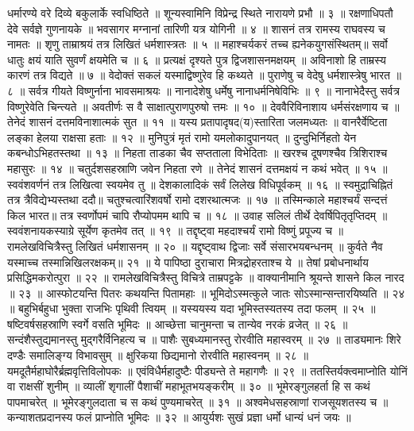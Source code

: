 धर्मारण्ये वरे दिव्ये बकुलार्के स्वधिष्ठिते ॥
शून्यस्वामिनि विप्रेन्द्र स्थिते नारायणे प्रभौ ॥ ३ ॥
रक्षणाधिपतौ देवे सर्वज्ञे गुणनायके ॥
भवसागर मग्नानां तारिणी यत्र योगिनी ॥ ४ ॥
शासनं तत्र रामस्य राघवस्य च नामतः ॥
शृणु ताम्राश्रयं तत्र लिखितं धर्मशास्त्रतः ॥ ५ ॥
महाश्चर्यकरं तच्च ह्यनेकयुगसंस्थितम्॥
सर्वो धातुः क्षयं याति सुवर्णं क्षयमेति च ॥ ६ ॥
प्रत्यक्षं दृश्यते पुत्र द्विजशासनमक्षयम् ॥
अविनाशो हि ताम्रस्य कारणं तत्र विद्यते ॥ ७ ॥
वेदोक्तं सकलं यस्माद्विष्णुरेव हि कथ्यते ॥
पुराणेषु च वेदेषु धर्मशास्त्रेषु भारत ॥ ८ ॥
सर्वत्र गीयते विष्णुर्नाना भावसमाश्रयः ॥
नानादेशेषु धर्मेषु नानाधर्मनिषेविभिः ॥ ९ ॥
नानाभेदैस्तु सर्वत्र विष्णुरेवेति चिन्त्यते ॥
अवतीर्णः स वै साक्षात्पुराणपुरुषो त्तमः ॥ १० ॥
देववैरिविनाशाय धर्मसंरक्षणाय च ॥
तेनेदं शासनं दत्तमविनाशात्मकं सुत ॥ ११ ॥
यस्य प्रतापादृषद(य)स्तारिता जलमध्यतः ॥
वानरैर्वेष्टिता लङ्का हेलया राक्षसा हताः ॥ १२ ॥
मुनिपुत्रं मृतं रामो यमलोकादुपानयत् ॥
दुन्दुभिर्निहतो येन कबन्धोऽभिहतस्तथा ॥ १३ ॥
निहता ताडका चैव सप्तताला विभेदिताः ॥
खरश्च दूषणश्चैव त्रिशिराश्च महासुरः ॥ १४ ॥
चतुर्दशसहस्राणि जवेन निहता रणे ॥
तेनेदं शासनं दत्तमक्षयं न कथं भवेत् ॥ १५ ॥
स्ववंशवर्णनं तत्र लिखित्वा स्वयमेव तु ॥
देशकालादिकं सर्वं लिलेख विधिपूर्वकम् ॥ १६ ॥
स्वमुद्राचिह्नितं तत्र त्रैविद्येभ्यस्तथा ददौ॥
चतुश्चत्वारिंशवर्षो रामो दशरथात्मजः ॥ १७ ॥
तस्मिन्काले महाश्चर्यं सन्दत्तं किल भारत॥
तत्र स्वर्णोपमं चापि रौप्योपमम थापि च ॥ १८ ॥
उवाह सलिलं तीर्थे देवर्षिपितृतृप्तिदम् ॥
स्ववंशनायकस्याग्रे सूर्येण कृतमेव तत् ॥ १९ ॥
तद्दृष्ट्वा महदाश्चर्यं रामो विष्णुं प्रपूज्य च ॥
रामलेखविचित्रैस्तु लिखितं धर्मशासनम् ॥ २० ॥
यद्दृष्ट्वाथ द्विजाः सर्वे संसारभयबन्धनम् ॥
कुर्वते नैव यस्माच्च तस्मान्निखिलरक्षकम्॥ २१ ॥
ये पापिष्ठा दुराचारा मित्रद्रोहरताश्च ये ॥
तेषां प्रबोधनार्थाय प्रसिद्धिमकरोत्पुरा ॥ २२ ॥
रामलेखविचित्रैस्तु विचित्रे ताम्रपट्टके ॥
वाक्यानीमानि श्रूयन्ते शासने किल नारद ॥ २३ ॥
आस्फोटयन्ति पितरः कथयन्ति पितामहाः ॥
भूमिदोऽस्मत्कुले जातः सोऽस्मान्सन्तारयिष्यति ॥ २४ ॥
बहुभिर्बहुधा भुक्ता राजभिः पृथिवी त्वियम् ॥
यस्ययस्य यदा भूमिस्तस्यतस्य तदा फलम् ॥ २५ ॥
षष्टिवर्षसहस्राणि स्वर्गे वसति भूमिदः ॥
आच्छेत्ता चानुमन्ता च तान्येव नरकं व्रजेत् ॥ २६ ॥
सन्दंशैस्तुद्यमानस्तु मुद्गरैर्विनिहत्य च ॥
पाशैः सुबध्यमानस्तु रोरवीति महास्वरम् ॥ २७ ॥
ताड्यमानः शिरे दण्डैः समालिङ्ग्य विभावसुम् ॥
क्षुरिकया छिद्यमानो रोरवीति महास्वनम् ॥ २८ ॥
यमदूतैर्महाघोरैर्ब्रह्मवृत्तिविलोपकः ॥
एवंविधैर्महादुष्टैः पीड्यन्ते ते महागणैः ॥ २९ ॥
ततस्तिर्यक्त्वमाप्नोति योनिं वा राक्षसीं शुनीम् ॥
व्यालीं शृगालीं पैशाचीं महाभूतभयङ्करीम् ॥ ३० ॥
भूमेरङ्गुलहर्ता हि स कथं पापमाचरेत् ॥
भूमेरङ्गुलदाता च स कथं पुण्यमाचरेत् ॥ ३१ ॥
अश्वमेधसहस्राणां राजसूयशतस्य च ॥
कन्याशतप्रदानस्य फलं प्राप्नोति भूमिदः ॥ ३२ ॥
आयुर्यशः सुखं प्रज्ञा धर्मो धान्यं धनं जयः ॥
